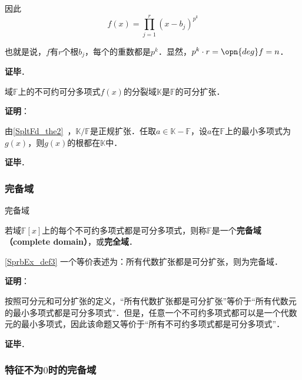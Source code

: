 因此
\begin{equation}
f(x) = \prod_{j=1}^{r} (x-b_j)^{p^k}
\end{equation}

也就是说，$f$有$r$个根$b_j$，每个的重数都是$p^k$．显然，$p^k\cdot r = \opn{deg}f = n$．

\textbf{证毕}．


\begin{theorem}{}
域$\mathbb{F}$上的不可约可分多项式$f(x)$的分裂域$\mathbb{K}$是$\mathbb{F}$的可分扩张．
\end{theorem}

\textbf{证明}：

由\autoref{SpltFd_the2}~，$\mathbb{K}/\mathbb{F}$是正规扩张．任取$a\in\mathbb{K}-\mathbb{F}$，设$a$在$\mathbb{F}$上的最小多项式为$g(x)$，则$g(x)$的根都在$\mathbb{K}$中．

\textbf{证毕}．





\subsubsection{完备域}


\begin{definition}{完备域}\label{SprbEx_def3}

若域$\mathbb{F}[x]$上的每个不可约多项式都是可分多项式，则称$\mathbb{F}$是一个\textbf{完备域（complete domain）}，或\textbf{完全域}．


\end{definition}

\begin{theorem}{}\label{SprbEx_the5}
\autoref{SprbEx_def3} 一个等价表述为：所有代数扩张都是可分扩张，则为完备域．
\end{theorem}




\textbf{证明}：

按照可分元和可分扩张的定义，“所有代数扩张都是可分扩张”等价于“所有代数元的最小多项式都是可分多项式”．但是，任意一个不可约多项式都可以是一个代数元的最小多项式，因此该命题又等价于“所有不可约多项式都是可分多项式”．

\textbf{证毕}．









\subsubsection{特征不为$0$时的完备域}


